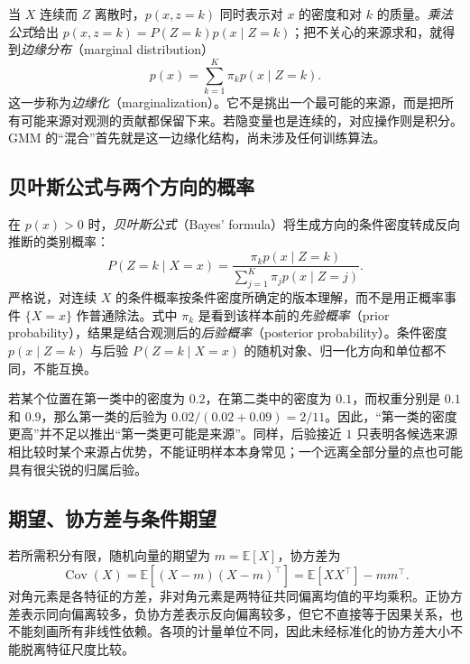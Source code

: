 \documentclass[UTF8,12pt,a4paper,fontset=fandol]{ctexart}
\begin{document}
当 $X$ 连续而 $Z$ 离散时，$p(x,z=k)$ 同时表示对 $x$ 的密度和对 $k$ 的质量。\emph{乘法公式}给出 $p(x,z=k)=P(Z=k)p(x\mid Z=k)$；把不关心的来源求和，就得到\emph{边缘分布}（marginal distribution）
\begin{equation}
p(x)=\sum_{k=1}^K\pi_kp(x\mid Z=k).
\label{eq:gmm-total-probability}
\end{equation}
这一步称为\emph{边缘化}（marginalization）。它不是挑出一个最可能的来源，而是把所有可能来源对观测的贡献都保留下来。若隐变量也是连续的，对应操作则是积分。GMM 的“混合”首先就是这一边缘化结构，尚未涉及任何训练算法。

\subsection{贝叶斯公式与两个方向的概率}
在 $p(x)>0$ 时，\emph{贝叶斯公式}（Bayes' formula）将生成方向的条件密度转成反向推断的类别概率：
\begin{equation}
P(Z=k\mid X=x)=\frac{\pi_kp(x\mid Z=k)}{\sum_{j=1}^K\pi_jp(x\mid Z=j)}.
\label{eq:gmm-bayes}
\end{equation}
严格说，对连续 $X$ 的条件概率按条件密度所确定的版本理解，而不是用正概率事件 $\{X=x\}$ 作普通除法。式中 $\pi_k$ 是看到该样本前的\emph{先验概率}（prior probability），结果是结合观测后的\emph{后验概率}（posterior probability）。条件密度 $p(x\mid Z=k)$ 与后验 $P(Z=k\mid X=x)$ 的随机对象、归一化方向和单位都不同，不能互换。

若某个位置在第一类中的密度为 $0.2$，在第二类中的密度为 $0.1$，而权重分别是 $0.1$ 和 $0.9$，那么第一类的后验为 $0.02/(0.02+0.09)=2/11$。因此，“第一类的密度更高”并不足以推出“第一类更可能是来源”。同样，后验接近 $1$ 只表明各候选来源相比较时某个来源占优势，不能证明样本本身常见；一个远离全部分量的点也可能具有很尖锐的归属后验。

\subsection{期望、协方差与条件期望}
若所需积分有限，随机向量的期望为 $m=\mathbb E[X]$，协方差为
\begin{equation}
\operatorname{Cov}(X)=\mathbb E[(X-m)(X-m)^\top]
=\mathbb E[XX^\top]-mm^\top.
\label{eq:gmm-covariance}
\end{equation}
对角元素是各特征的方差，非对角元素是两特征共同偏离均值的平均乘积。正协方差表示同向偏离较多，负协方差表示反向偏离较多，但它不直接等于因果关系，也不能刻画所有非线性依赖。各项的计量单位不同，因此未经标准化的协方差大小不能脱离特征尺度比较。
\end{document}
